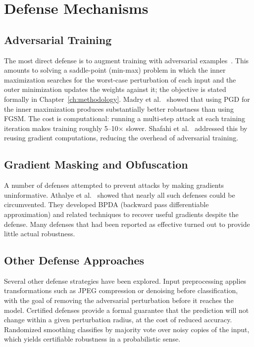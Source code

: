 \section{Defense Mechanisms}

\subsection{Adversarial Training}

The most direct defense is to augment training with adversarial examples~\cite{goodfellow2015explaining,kurakin2016adversarialscale,madry2018towards}. This amounts to solving a saddle-point (min-max) problem in which the inner maximization searches for the worst-case perturbation of each input and the outer minimization updates the weights against it; the objective is stated formally in Chapter~\ref{ch:methodology}. Madry et al.~\cite{madry2018towards} showed that using PGD for the inner maximization produces substantially better robustness than using FGSM. The cost is computational: running a multi-step attack at each training iteration makes training roughly 5--10$\times$ slower. Shafahi et al.~\cite{shafahi2019adversarialfree} addressed this by reusing gradient computations, reducing the overhead of adversarial training.

\subsection{Gradient Masking and Obfuscation}

A number of defenses attempted to prevent attacks by making gradients uninformative. Athalye et al.~\cite{athalye2018obfuscated} showed that nearly all such defenses could be circumvented. They developed BPDA (backward pass differentiable approximation) and related techniques to recover useful gradients despite the defense. Many defenses that had been reported as effective turned out to provide little actual robustness.

\subsection{Other Defense Approaches}

Several other defense strategies have been explored. Input preprocessing applies transformations such as JPEG compression or denoising before classification, with the goal of removing the adversarial perturbation before it reaches the model. Certified defenses provide a formal guarantee that the prediction will not change within a given perturbation radius, at the cost of reduced accuracy. Randomized smoothing classifies by majority vote over noisy copies of the input, which yields certifiable robustness in a probabilistic sense.

